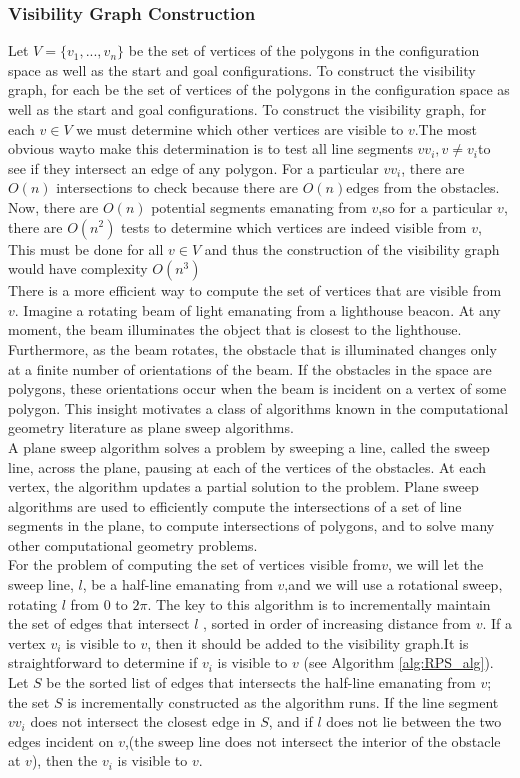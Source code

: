 \documentclass[11pt]{article}
\begin{document}
\subsubsection{Visibility Graph Construction}
Let $V=\{v_1,...,v_n\}$ be the set of vertices of the polygons in the configuration space as well as the start and goal configurations. To construct the visibility graph, for each be the set of vertices of the polygons in the configuration space as well as the start and goal configurations. To construct the visibility graph, for each $v \in V$ we must determine which other vertices are visible to $v$.The most obvious wayto make this determination is to test all line segments $vv_i,v \ne v_i$to see if they intersect an edge of any polygon. For a particular $vv_i$, there are $O(n)$ intersections to check because there are $O(n)$edges from the obstacles. Now, there are $O(n)$ potential segments emanating from $v$,so for a particular $v$, there are $O(n^2)$ tests to determine which vertices are indeed visible from $v$, This must be done for all $v \in V$ and thus the construction of the visibility graph would have complexity $O(n^3)$ \\
There is a more efficient way to compute the set of vertices that are visible from $v$. Imagine a rotating beam of light emanating from a lighthouse beacon. At any moment, the beam illuminates the object that is closest to the lighthouse. Furthermore, as the beam rotates, the obstacle that is illuminated changes only at a finite number of orientations of the beam. If the obstacles in the space are polygons, these orientations occur when the beam is incident on a vertex of some polygon. This insight motivates a class of algorithms known in the computational geometry literature as plane sweep algorithms.\\
A plane sweep algorithm solves a problem by sweeping a line, called the sweep line, across the plane, pausing at each of the vertices of the obstacles. At each vertex, the algorithm updates a partial solution to the problem. Plane sweep algorithms are used to efficiently compute the intersections of a set of line segments in the plane, to compute intersections of polygons, and to solve many other computational geometry problems.\\
For the problem of computing the set of vertices visible from$v$, we will let the sweep line, $l$, be a half-line emanating from $v$,and we will use a rotational sweep, rotating $l$ from 0 to $2\pi$. The key to this algorithm is to incrementally maintain the set of edges that intersect $l$ , sorted in order of increasing distance from $v$. If a vertex $v_i$ is visible to $v$, then it should be added to the visibility graph.It is straightforward to determine if $v_i$ is visible to $v$ (see Algorithm \ref{alg:RPS_alg}). Let $S$ be the sorted list of edges that intersects the half-line emanating from $v$; the set $S$ is incrementally constructed as the algorithm runs. If the line segment $vv_i$ does not intersect the closest edge in $S$, and if $l$ does not lie between the two edges incident on $v$,(the sweep line does not intersect the interior of the obstacle at $v$), then the $v_i$ is visible to $v$.\\
\end{document}
